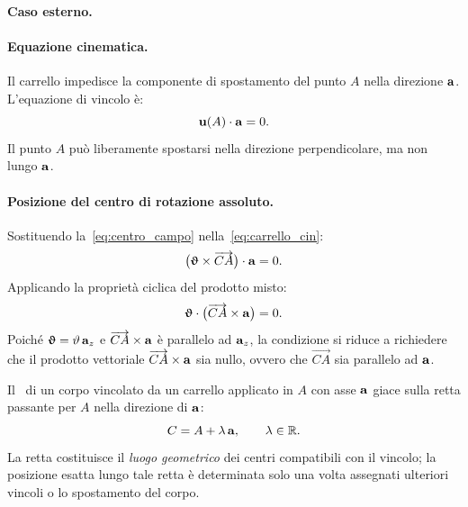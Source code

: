 



\paragraph{Caso esterno.}

\paragraph{Equazione cinematica.}
Il carrello impedisce la componente di spostamento del punto $A$
nella direzione $\mathbf{a}$. L'equazione di vincolo è:
\begin{equation}\label{eq:carrello_cin}
	\mathbf{u} (A) \cdot \mathbf{a} = 0.
\end{equation}
Il punto $A$ può liberamente spostarsi nella direzione
perpendicolare, ma non lungo $\mathbf{a}$.

\paragraph{Posizione del centro di rotazione assoluto.}
Sostituendo la~\eqref{eq:centro_campo} nella~\eqref{eq:carrello_cin}:
\begin{equation}
	\bigl(\bm{\upvartheta} \times \overrightarrow{CA}\bigr)
	\cdot \mathbf{a} = 0.
\end{equation}
Applicando la proprietà ciclica del prodotto misto:
\begin{equation}
	\bm{\upvartheta} \cdot \bigl(\overrightarrow{CA} \times \mathbf{a}\bigr)
	= 0.
\end{equation}
Poiché $\bm{\upvartheta} = \vartheta\,\mathbf{a}_z$ e
$\overrightarrow{CA} \times \mathbf{a}$ è parallelo ad $\mathbf{a}_z$, la
condizione si riduce a richiedere che il prodotto vettoriale
$\overrightarrow{CA} \times \mathbf{a}$ sia nullo, ovvero che
$\overrightarrow{CA}$ sia parallelo ad $\mathbf{a}$.

\begin{proposizione}
	\label{prop:CR_carrello}
	Il \CRa\ di un corpo vincolato da un carrello applicato in $A$
	con asse $\mathbf{a}$ giace sulla retta passante per $A$ nella
	direzione di $\mathbf{a}$:
	\begin{equation}\label{eq:CR_carrello}
		C = A + \lambda\,\mathbf{a}, \qquad \lambda \in \mathbb{R}.
	\end{equation}
	La retta costituisce il \emph{luogo geometrico} dei centri
	compatibili con il vincolo; la posizione esatta lungo tale
	retta è determinata solo una volta assegnati ulteriori vincoli
	o lo spostamento del corpo.
\end{proposizione}


